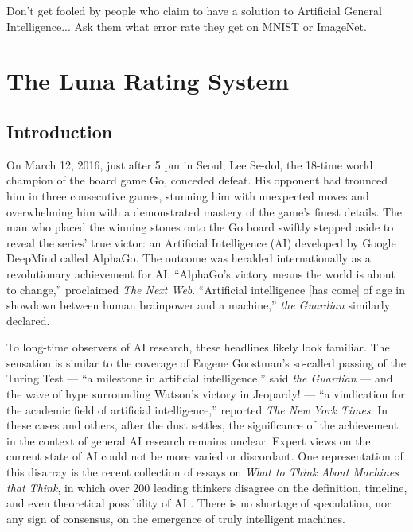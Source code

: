 \begin{savequote}[75mm]
Don't get fooled by people who claim to have a solution to Artificial General Intelligence... Ask them what error rate they get on MNIST or ImageNet.
\end{savequote}


\chapter{The Luna Rating System}

\section{Introduction}

On March 12, 2016, just after 5 pm in Seoul, Lee Se-dol, the 18-time world champion of the board game Go, conceded defeat. His opponent had trounced him in three consecutive games, stunning him with unexpected moves and overwhelming him with a demonstrated mastery of the game's finest details. The man who placed the winning stones onto the Go board swiftly stepped aside to reveal the series' true victor: an Artificial Intelligence (AI) developed by Google DeepMind called AlphaGo\cite{silver2016mastering}. The outcome was heralded internationally as a revolutionary achievement for AI. ``AlphaGo's victory means the world is about to change,'' proclaimed \textit{The Next Web}\cite{1_nextweb_2016}. ``Artificial intelligence [has come] of age in showdown between human brainpower and a machine,'' \textit{the Guardian} similarly declared\cite{1_the_guardian_2016}. 

To long-time observers of AI research, these headlines likely look familiar. The sensation is similar to the coverage of Eugene Goostman's so-called passing of the Turing Test --- ``a milestone in artificial intelligence,'' said \textit{the Guardian}\cite{1_the_guardian_2014, occasional_pamphlet_2014} --- and the wave of hype surrounding Watson's victory in Jeopardy! --- ``a vindication for the academic field of artificial intelligence,'' reported \textit{The New York Times}\cite{1_newyorktimes_2011}. In these cases and others, after the dust settles, the significance of the achievement in the context of general AI research remains unclear. Expert views on the current state of AI could not be more varied or discordant. One representation of this disarray is the recent collection of essays on \textit{What to Think About Machines that Think}, in which over 200 leading thinkers disagree on the definition, timeline, and even theoretical possibility of AI \cite{edge2016what}. There is no shortage of speculation, nor any sign of consensus, on the emergence of truly intelligent machines.

